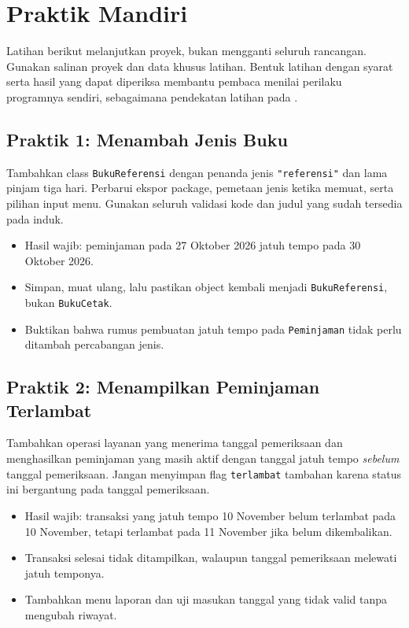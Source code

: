 \section{Praktik Mandiri}

Latihan berikut melanjutkan proyek, bukan mengganti seluruh rancangan. Gunakan salinan proyek dan data khusus latihan. Bentuk latihan dengan syarat serta hasil yang dapat diperiksa membantu pembaca menilai perilaku programnya sendiri, sebagaimana pendekatan latihan pada \cite{edcornerOopExercises}.

\subsection{Praktik 1: Menambah Jenis Buku}

Tambahkan class \texttt{BukuReferensi} dengan penanda jenis \texttt{"referensi"} dan lama pinjam tiga hari. Perbarui ekspor package, pemetaan jenis ketika memuat, serta pilihan input menu. Gunakan seluruh validasi kode dan judul yang sudah tersedia pada induk.

\begin{itemize}
  \item Hasil wajib: peminjaman pada 27 Oktober 2026 jatuh tempo pada 30 Oktober 2026.
  \item Simpan, muat ulang, lalu pastikan object kembali menjadi \texttt{BukuReferensi}, bukan \texttt{BukuCetak}.
  \item Buktikan bahwa rumus pembuatan jatuh tempo pada \texttt{Peminjaman} tidak perlu ditambah percabangan jenis.
\end{itemize}

\subsection{Praktik 2: Menampilkan Peminjaman Terlambat}

Tambahkan operasi layanan yang menerima tanggal pemeriksaan dan menghasilkan peminjaman yang masih aktif dengan tanggal jatuh tempo \emph{sebelum} tanggal pemeriksaan. Jangan menyimpan flag \texttt{terlambat} tambahan karena status ini bergantung pada tanggal pemeriksaan.

\begin{itemize}
  \item Hasil wajib: transaksi yang jatuh tempo 10 November belum terlambat pada 10 November, tetapi terlambat pada 11 November jika belum dikembalikan.
  \item Transaksi selesai tidak ditampilkan, walaupun tanggal pemeriksaan melewati jatuh temponya.
  \item Tambahkan menu laporan dan uji masukan tanggal yang tidak valid tanpa mengubah riwayat.
\end{itemize}

